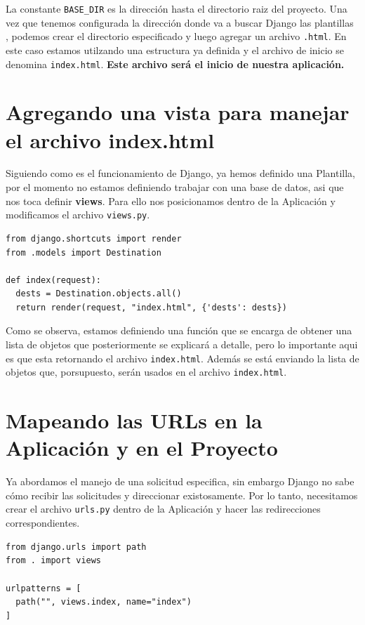 \documentclass[10pt, a4paper]{article}
\newcommand{\mpy}[1]{\texttt{#1}}
\begin{document}
La constante \mpy{BASE_DIR} es la dirección hasta el directorio raiz del proyecto.
\singlespacing
Una vez que tenemos configurada la dirección donde va a buscar Django las plantillas , podemos crear el directorio especificado y luego agregar un archivo \mpy{.html}. En este caso estamos utilzando una estructura ya definida y el archivo de inicio se denomina \mpy{index.html}. \textbf{Este archivo será el inicio de nuestra aplicación.}

\section{Agregando una vista para manejar el archivo index.html}
Siguiendo como es el funcionamiento de Django, ya hemos definido una Plantilla, por el momento no estamos definiendo trabajar con una base de datos, asi que nos toca definir \textbf{views}. Para ello nos posicionamos dentro de la Aplicación y modificamos el archivo \mpy{views.py}.

\begin{verbatim}
from django.shortcuts import render
from .models import Destination

def index(request):
  dests = Destination.objects.all()
  return render(request, "index.html", {'dests': dests})
\end{verbatim}

Como se observa, estamos definiendo una función que se encarga de obtener una lista de objetos que posteriormente se explicará a detalle, pero lo importante aqui es que esta retornando el archivo \mpy{index.html}. Además se está enviando la lista de objetos que, porsupuesto, serán usados en el archivo \mpy{index.html}.

\section{Mapeando las URLs en la Aplicación y en el Proyecto}
Ya abordamos el manejo de una solicitud especifica, sin embargo Django no sabe cómo recibir las solicitudes y direccionar existosamente. Por lo tanto, necesitamos crear el archivo \mpy{urls.py} dentro de la Aplicación y hacer las redirecciones correspondientes.

\begin{verbatim}
from django.urls import path
from . import views

urlpatterns = [
  path("", views.index, name="index")
]
\end{verbatim}
\end{document}
